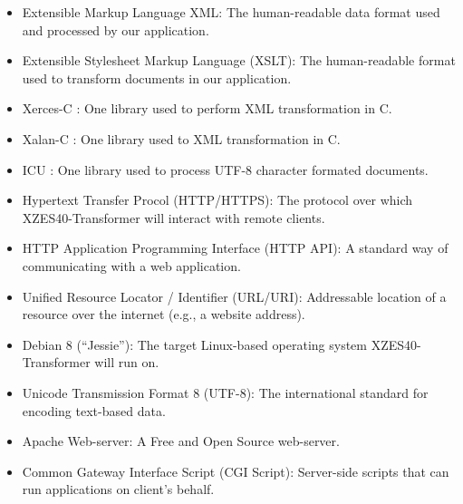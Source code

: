\begin{itemize}
  \item Extensible Markup Language XML: The human-readable data format used and processed by our application.
  \item Extensible Stylesheet Markup Language (XSLT): The human-readable format used to transform documents in our application.
  \item Xerces-C \cite{xerces}: One library used to perform XML transformation in C.
  \item Xalan-C \cite{xalan}: One library used to XML transformation in C.
  \item ICU \cite{icu}: One library used to process UTF-8 character formated documents.
  \item Hypertext Transfer Procol (HTTP/HTTPS): The protocol over which XZES40-Transformer will interact with remote clients.
  \item HTTP Application Programming Interface (HTTP API): A standard way of communicating with a web application.
  \item Unified Resource Locator / Identifier (URL/URI): Addressable location of a resource over the internet (e.g., a website address).
  \item Debian 8 (``Jessie''): The target Linux-based operating system XZES40-Transformer will run on.
  \item Unicode Transmission Format 8 (UTF-8): The international standard for encoding text-based data.
  \item Apache Web-server: A Free and Open Source web-server.
  \item Common Gateway Interface Script (CGI Script): Server-side scripts that can run applications on client's behalf.
\end{itemize}
% 
% 

